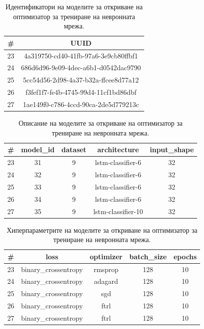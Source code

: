 \documentclass{article}
\begin{document}
\begin{table}[H]
\centering
\captionsetup{justification=centering}
\begin{tabular}{|c||c|}
\hline
\# & UUID\\
\hline
23 & 4a319750-cd40-41fb-97a6-3e9cb80ffbf1\\
24 & 686d6d96-9e09-4dec-a6b1-d0542dac9790\\
25 & 5cc54d56-2d98-4a37-b32a-ffcee8d77a12\\
26 & f3fef1f7-fe4b-4745-99d4-11cf1bd86dbf\\
27 & 1ae149f0-c786-4ccd-90ca-2de5d779213c\\
\hline
\end{tabular}
\caption{Идентификатори на моделите за откриване на оптимизатор за трениране на невронната мрежа.}
\end{table}

\begin{table}[H]
\centering
\captionsetup{justification=centering}
\begin{tabular}{|c||c|c|c|c|}
\hline
\# & model\_id & dataset & architecture & input\_shape\\
\hline
23 & 31 & 9 & lstm-classifier-6 & 32\\
24 & 32 & 9 & lstm-classifier-6 & 32\\
25 & 33 & 9 & lstm-classifier-6 & 32\\
26 & 34 & 9 & lstm-classifier-6 & 32\\
27 & 35 & 9 & lstm-classifier-10 & 32\\
\hline
\end{tabular}
\caption{Описание на моделите за откриване на оптимизатор за трениране на невронната мрежа.}
\end{table}

\begin{table}[H]
\centering
\captionsetup{justification=centering}
\begin{tabular}{|c||c|c|c|c|}
\hline
\# & loss & optimizer & batch\_size & epochs\\
\hline
23 & binary\_crossentropy & rmsprop & 128 & 10\\
24 & binary\_crossentropy & adagard & 128 & 10\\
25 & binary\_crossentropy & sgd & 128 & 10\\
26 & binary\_crossentropy & ftrl & 128 & 10\\
27 & binary\_crossentropy & ftrl & 128 & 10\\
\hline
\end{tabular}
\caption{Хиперпараметрите на моделите за откриване на оптимизатор за трениране на невронната мрежа.}
\end{table}
\end{document}
